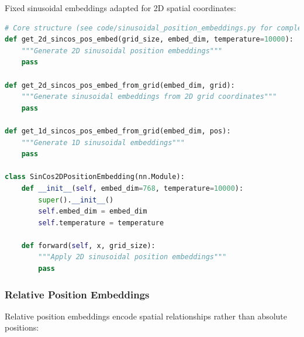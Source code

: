 Fixed sinusoidal embeddings adapted for 2D spatial coordinates:

\begin{lstlisting}[language=Python, caption=2D sinusoidal position embeddings]
# Core structure (see code/sinusoidal_position_embeddings.py for complete implementation)
def get_2d_sincos_pos_embed(grid_size, embed_dim, temperature=10000):
    """Generate 2D sinusoidal position embeddings"""
    pass

def get_2d_sincos_pos_embed_from_grid(embed_dim, grid):
    """Generate sinusoidal embeddings from 2D grid coordinates"""
    pass

def get_1d_sincos_pos_embed_from_grid(embed_dim, pos):
    """Generate 1D sinusoidal embeddings"""
    pass

class SinCos2DPositionEmbedding(nn.Module):
    def __init__(self, embed_dim=768, temperature=10000):
        super().__init__()
        self.embed_dim = embed_dim
        self.temperature = temperature
    
    def forward(self, x, grid_size):
        """Apply 2D sinusoidal position embeddings"""
        pass
\end{lstlisting}

\subsubsection{Relative Position Embeddings}

Relative position embeddings encode spatial relationships rather than absolute positions:

